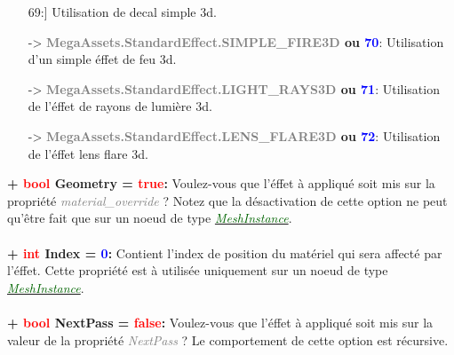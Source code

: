 \documentclass[a4paper, 11pt]{article}
\begin{document}
\begin{itemize}
{		{69}}:] Utilisation de decal simple 3d.
		\item [-> \textbf{\textcolor{gray}{MegaAssets.StandardEffect.SIMPLE\_FIRE3D} ou \textcolor{blue}
		{70}}:] Utilisation d'un simple éffet de feu 3d.
		\item [-> \textbf{\textcolor{gray}{MegaAssets.StandardEffect.LIGHT\_RAYS3D} ou \textcolor{blue}
		{71}}:] Utilisation de l'éffet de rayons de lumière 3d.
		\item [-> \textbf{\textcolor{gray}{MegaAssets.StandardEffect.LENS\_FLARE3D} ou \textcolor{blue}
		{72}}:] Utilisation de l'éffet lens flare 3d.\\
	\end{itemize}
	\textbf{+ \textcolor{red}{bool} Geometry = \textcolor{red}{true}:} Voulez-vous que l'éffet à appliqué 
	soit mis sur la propriété \textit{\textcolor{gray}{material\_override}} ? Notez que la désactivation de 
	cette option ne peut qu'être fait que sur un noeud de type
	\href{https://docs.godotengine.org/en/stable/classes/class_meshinstance.html}
	{\textit{\textcolor{darkgreen}{MeshInstance}}}.\\\\
	\textbf{+ \textcolor{red}{int} Index = \textcolor{blue}{0}:} Contient l'index de position du matériel 
	qui sera affecté par l'éffet. Cette propriété est à utilisée uniquement sur un noeud de type
	\href{https://docs.godotengine.org/en/stable/classes/class_meshinstance.html}
	{\textit{\textcolor{darkgreen}{MeshInstance}}}.\\\\
	\textbf{+ \textcolor{red}{bool} NextPass = \textcolor{red}{false}:} Voulez-vous que l'éffet à appliqué
	soit mis sur la valeur de la propriété \textit{\textcolor{gray}{NextPass}} ? Le comportement de cette 
	option est récursive.
\end{document}
